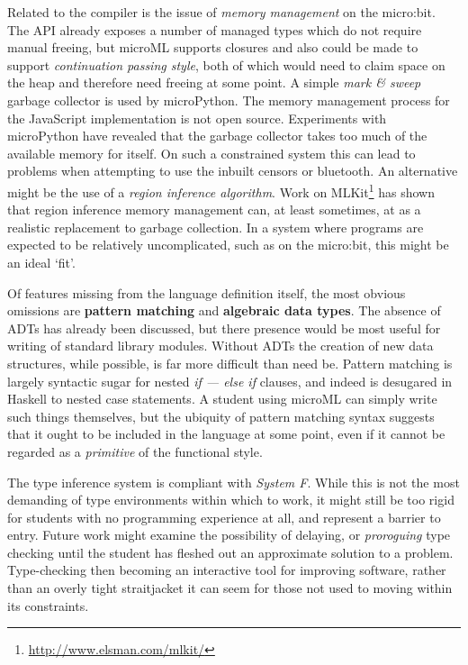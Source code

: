\documentclass[12pt, a4paper]{report}
\begin{document}
Related to the compiler is the issue of \textit{memory management} on the micro:bit. The API already
exposes a number of managed types which do not require manual freeing, but microML supports closures
and also could be made to support \textit{continuation passing style}, both of which would need to
claim space on the heap and therefore need freeing at some point. A simple \textit{mark \& sweep}
garbage collector is used by microPython. The memory management process for the JavaScript
implementation is not open source. Experiments with microPython have revealed that the garbage
collector takes too much of the available memory for itself. On such a constrained system this can
lead to problems when attempting to use the inbuilt censors or bluetooth. An alternative might be
the use of a \textit{region inference algorithm}\cite{Tofte:2004:RRM:993034.993040}. Work on
MLKit\footnote{\url{http://www.elsman.com/mlkit/}} has shown that region inference memory management
can, at least sometimes, at as a realistic replacement to garbage collection. In a system where
programs are expected to be relatively uncomplicated, such as on the micro:bit, this might be an
ideal `fit'.

Of features missing from the language definition itself, the most obvious omissions are
\textbf{pattern matching} and \textbf{algebraic data types}. The absence of ADTs has already been
discussed, but there presence would be most useful for writing of standard library modules. Without
ADTs the creation of new data structures, while possible, is far more difficult than need be.
Pattern matching is largely syntactic sugar for nested \textit{if --- else if} clauses, and indeed
is desugared in Haskell to nested case statements. A student using microML can simply write such
things themselves, but the ubiquity of pattern matching syntax suggests that it ought to be included
in the language at some point, even if it cannot be regarded as a \textit{primitive} of the
functional style. 

The type inference system is compliant with \textit{System F}. While this is not the most demanding
of type environments within which to work, it might still be too rigid for students with no
programming experience at all, and represent a barrier to entry. Future work might examine the
possibility of delaying, or \textit{proroguing} type checking until the student has fleshed out an
approximate solution to a problem\cite{Afshari:2012:LPP:2384592.2384595}. Type-checking then
becoming an interactive tool for improving software, rather than an overly tight straitjacket it can
seem for those not used to moving within its constraints.
\end{document}
